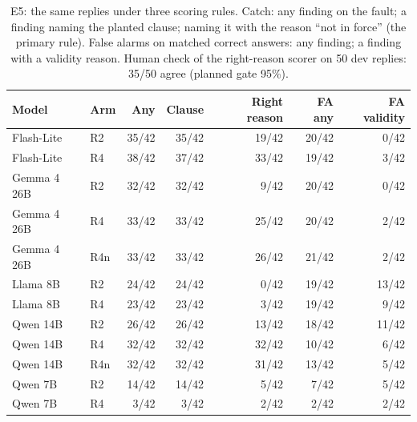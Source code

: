 \begin{table}[t]\centering\small
\caption{E5: the same replies under three scoring rules. Catch: any finding on the fault; a finding naming the planted clause; naming it with the reason ``not in force'' (the primary rule). False alarms on matched correct answers: any finding; a finding with a validity reason. Human check of the right-reason scorer on 50 dev replies: 35/50 agree (planned gate 95\%).}
\label{tab:scoring}
\begin{tabular}{llrrrrr}
\toprule
Model & Arm & Any & Clause & Right reason & FA any & FA validity \\
\midrule
Flash-Lite & R2 & 35/42 & 35/42 & 19/42 & 20/42 & 0/42 \\
Flash-Lite & R4 & 38/42 & 37/42 & 33/42 & 19/42 & 3/42 \\
Gemma 4 26B & R2 & 32/42 & 32/42 & 9/42 & 20/42 & 0/42 \\
Gemma 4 26B & R4 & 33/42 & 33/42 & 25/42 & 20/42 & 2/42 \\
Gemma 4 26B & R4n & 33/42 & 33/42 & 26/42 & 21/42 & 2/42 \\
Llama 8B & R2 & 24/42 & 24/42 & 0/42 & 19/42 & 13/42 \\
Llama 8B & R4 & 23/42 & 23/42 & 3/42 & 19/42 & 9/42 \\
Qwen 14B & R2 & 26/42 & 26/42 & 13/42 & 18/42 & 11/42 \\
Qwen 14B & R4 & 32/42 & 32/42 & 32/42 & 10/42 & 6/42 \\
Qwen 14B & R4n & 32/42 & 32/42 & 31/42 & 13/42 & 5/42 \\
Qwen 7B & R2 & 14/42 & 14/42 & 5/42 & 7/42 & 5/42 \\
Qwen 7B & R4 & 3/42 & 3/42 & 2/42 & 2/42 & 2/42 \\
\bottomrule
\end{tabular}
\end{table}
